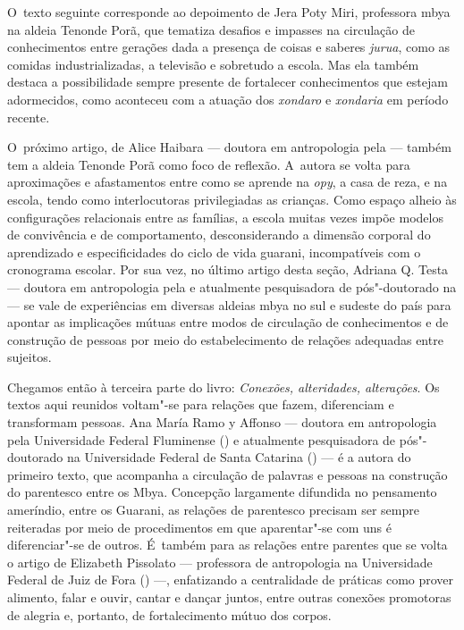 O~texto seguinte corresponde ao depoimento de Jera Poty Miri, professora
mbya na aldeia Tenonde Porã, que tematiza desafios e impasses na
circulação de conhecimentos entre gerações dada a presença de coisas e
saberes \emph{jurua}, como as comidas industrializadas, a televisão e
sobretudo a escola. Mas ela também destaca a possibilidade sempre
presente de fortalecer conhecimentos que estejam adormecidos, como
aconteceu com a atuação dos \emph{xondaro} e \emph{xondaria} em período recente. 

O~próximo artigo, de Alice Haibara --- doutora em antropologia pela  ---
também tem a aldeia Tenonde Porã como foco de reflexão. A~autora se
volta para aproximações e afastamentos entre como se aprende na \emph{opy}, a
casa de reza, e na escola, tendo como interlocutoras privilegiadas as
crianças. Como espaço alheio às configurações relacionais entre as
famílias, a escola muitas vezes impõe modelos de convivência e de
comportamento, desconsiderando a dimensão corporal do aprendizado e
especificidades do ciclo de vida guarani, incompatíveis com o
cronograma escolar. Por sua vez, no último artigo desta seção, Adriana
Q. Testa --- doutora em antropologia pela  e atualmente pesquisadora
de pós"-doutorado na  --- se vale de experiências em diversas
aldeias mbya no sul e sudeste do país para apontar as implicações
mútuas entre modos de circulação de conhecimentos e de construção de
pessoas por meio do estabelecimento de relações adequadas entre
sujeitos. 

Chegamos então à terceira parte do livro: \emph{Conexões, alteridades,
alterações}. Os textos aqui reunidos voltam"-se para relações que fazem,
diferenciam e transformam pessoas. Ana María Ramo y Affonso --- doutora
em antropologia pela Universidade Federal Fluminense () e atualmente
pesquisadora de pós"-doutorado na Universidade Federal de Santa Catarina
() --- é a autora do primeiro texto, que acompanha a circulação de
palavras e pessoas na construção do parentesco entre os Mbya. Concepção
largamente difundida no pensamento ameríndio, entre os Guarani, as relações
de parentesco precisam ser sempre reiteradas por meio de procedimentos em
que aparentar"-se com uns é diferenciar"-se de outros. É~também para as
relações entre parentes que se volta o artigo de Elizabeth Pissolato ---
professora de antropologia na Universidade Federal de Juiz de Fora
() ---, enfatizando a centralidade de práticas como prover alimento,
falar e ouvir, cantar e dançar juntos, entre outras conexões promotoras
de alegria e, portanto, de fortalecimento mútuo dos corpos.


